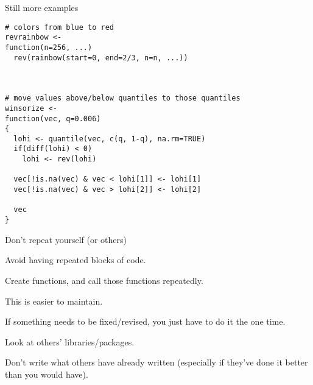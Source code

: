 \documentclass[12pt,t]{beamer}
\begin{document}
\begin{frame}[fragile,c]{Still more examples}

\begin{lstlisting}
# colors from blue to red
revrainbow <-
function(n=256, ...)
  rev(rainbow(start=0, end=2/3, n=n, ...))



# move values above/below quantiles to those quantiles
winsorize <-
function(vec, q=0.006)
{
  lohi <- quantile(vec, c(q, 1-q), na.rm=TRUE)
  if(diff(lohi) < 0)
    lohi <- rev(lohi)

  vec[!is.na(vec) & vec < lohi[1]] <- lohi[1]
  vec[!is.na(vec) & vec > lohi[2]] <- lohi[2]

  vec
}
\end{lstlisting}

\end{frame}


\begin{frame}{Don't repeat yourself (or others)}

\bbi
\item Avoid having repeated blocks of code.
\item Create functions, and call those functions repeatedly.
\item This is easier to maintain.
  \bi
  \item If something needs to be fixed/revised, you just have to do it
    the one time.
  \ei
\item Look at others' libraries/packages.
  \bi
  \item Don't write what others have already written (especially if
    they've done it better than you would have).
  \ei
\ei

\end{frame}
\end{document}
